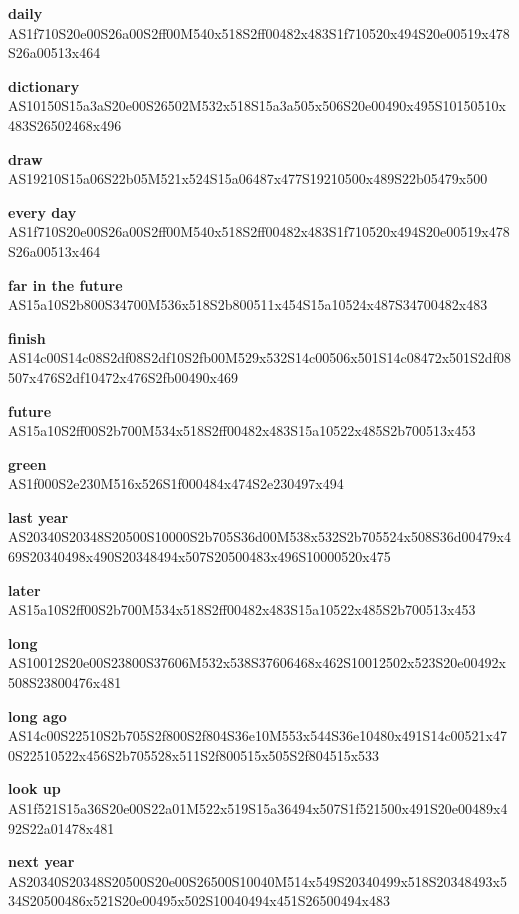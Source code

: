 \documentclass{article}
\begin{document}
\begin{glossary}
\textbf{daily}\\
AS1f710S20e00S26a00S2ff00M540x518S2ff00482x483S1f710520x494S20e00519x478S26a00513x464

\textbf{dictionary}\\
AS10150S15a3aS20e00S26502M532x518S15a3a505x506S20e00490x495S10150510x483S26502468x496

\textbf{draw}\\
AS19210S15a06S22b05M521x524S15a06487x477S19210500x489S22b05479x500

\textbf{every day}\\
AS1f710S20e00S26a00S2ff00M540x518S2ff00482x483S1f710520x494S20e00519x478S26a00513x464

\textbf{far in the future}\\
AS15a10S2b800S34700M536x518S2b800511x454S15a10524x487S34700482x483

\textbf{finish}\\
AS14c00S14c08S2df08S2df10S2fb00M529x532S14c00506x501S14c08472x501S2df08507x476S2df10472x476S2fb00490x469

\textbf{future}\\
AS15a10S2ff00S2b700M534x518S2ff00482x483S15a10522x485S2b700513x453

\textbf{green}\\
AS1f000S2e230M516x526S1f000484x474S2e230497x494

\textbf{last year}\\
AS20340S20348S20500S10000S2b705S36d00M538x532S2b705524x508S36d00479x469S20340498x490S20348494x507S20500483x496S10000520x475

\textbf{later}\\
AS15a10S2ff00S2b700M534x518S2ff00482x483S15a10522x485S2b700513x453

\textbf{long}\\
AS10012S20e00S23800S37606M532x538S37606468x462S10012502x523S20e00492x508S23800476x481

\textbf{long ago}\\
AS14c00S22510S2b705S2f800S2f804S36e10M553x544S36e10480x491S14c00521x470S22510522x456S2b705528x511S2f800515x505S2f804515x533

\textbf{look up}\\
AS1f521S15a36S20e00S22a01M522x519S15a36494x507S1f521500x491S20e00489x492S22a01478x481

\textbf{next year}\\
AS20340S20348S20500S20e00S26500S10040M514x549S20340499x518S20348493x534S20500486x521S20e00495x502S10040494x451S26500494x483


\end{glossary}
\end{document}
